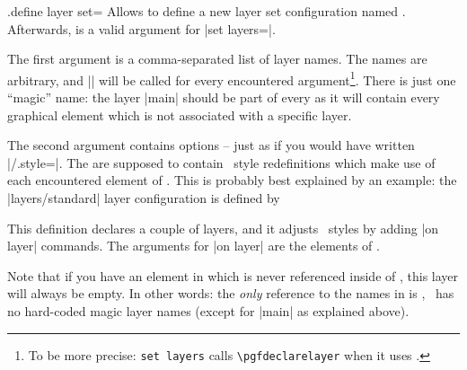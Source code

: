 \begin{handler}{{.define layer set}=}
	Allows to define a new layer set configuration named . Afterwards,  is a valid argument for |set layers=|.

	The first argument  is a comma-separated list of layer names. The names are arbitrary, and |\pgfdeclarelayer| will be called for every encountered argument\footnote{To be more precise: \texttt{set layers} calls \texttt{\textbackslash pgfdeclarelayer} when it uses .}. There is just one ``magic'' name: the layer |main| should be part of every  as it will contain every graphical element which is not associated with a specific layer.

	The second argument  contains options -- just as if you would have written |/.style=|. The  are supposed to contain \PGFPlots\ style redefinitions which make use of each encountered element of . This is probably best explained by an example: the |layers/standard| layer configuration is defined by
\begin{codeexample}
\end{codeexample}
	\noindent This definition declares a couple of layers, and it adjusts \PGFPlots\ styles by adding |on layer| commands. The arguments for |on layer| are the elements of .

	Note that if you have an element in  which is never referenced inside of , this layer will always be empty. In other words: the \emph{only} reference to the names in  is , \PGFPlots\ has no hard-coded magic layer names (except for |main| as explained above).


\end{handler}
